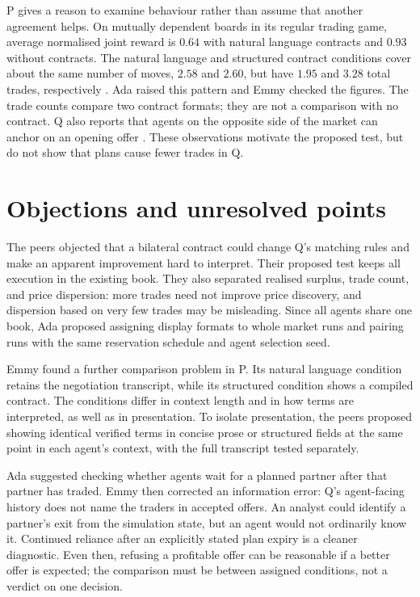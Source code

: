 \documentclass{article}
\begin{document}
P gives a reason to examine behaviour rather than assume that another agreement helps. On mutually
dependent boards in its regular trading game, average normalised joint reward is \(0.64\) with
natural language contracts and \(0.93\) without contracts. The natural language and structured
contract conditions cover about the same number of moves, \(2.58\) and \(2.60\), but have \(1.95\)
and \(3.28\) total trades, respectively \cite{P}. Ada raised this pattern and Emmy checked the
figures. The trade counts compare two contract formats; they are not a comparison with no contract.
Q also reports that agents on the opposite side of the market can anchor on an opening offer
\cite{Q}. These observations motivate the proposed test, but do not show that plans cause fewer
trades in Q.

\section{Objections and unresolved points}

The peers objected that a bilateral contract could change Q's matching rules and make an apparent
improvement hard to interpret. Their proposed test keeps all execution in the existing book. They
also separated realised surplus, trade count, and price dispersion: more trades need not improve
price discovery, and dispersion based on very few trades may be misleading. Since all agents share
one book, Ada proposed assigning display formats to whole market runs and pairing runs with the same
reservation schedule and agent selection seed.

Emmy found a further comparison problem in P. Its natural language condition retains the negotiation
transcript, while its structured condition shows a compiled contract. The conditions differ in
context length and in how terms are interpreted, as well as in presentation. To isolate
presentation, the peers proposed showing identical verified terms in concise prose or structured
fields at the same point in each agent's context, with the full transcript tested separately.

Ada suggested checking whether agents wait for a planned partner after that partner has traded. Emmy
then corrected an information error: Q's agent-facing history does not name the traders in accepted
offers. An analyst could identify a partner's exit from the simulation state, but an agent would not
ordinarily know it. Continued reliance after an explicitly stated plan expiry is a cleaner
diagnostic. Even then, refusing a profitable offer can be reasonable if a better offer is expected;
the comparison must be between assigned conditions, not a verdict on one decision.
\end{document}
